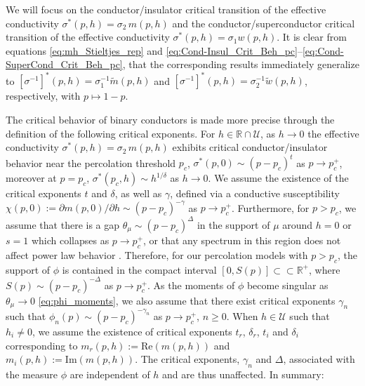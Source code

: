 \documentclass[jmp,graphicx]{revtex4-1}
\begin{document}
We will focus on the conductor/insulator critical transition of the
effective conductivity $\sigma^*(p,h)=\sigma_2\,m(p,h)$ and the
conductor/superconductor critical transition of the effective
conductivity $\sigma^*(p,h)=\sigma_1w(p,h)$. It is clear from equations
\eqref{eq:mh_Stieltjes_rep} and 
\eqref{eq:Cond-Insul_Crit_Beh_pc}--\eqref{eq:Cond-SuperCond_Crit_Beh_pc},
that the corresponding results immediately generalize to
$[\sigma^{-1}]^*(p,h)=\sigma_1^{-1}\tilde{m}(p,h)$ and
$[\sigma^{-1}]^*(p,h)=\sigma_2^{-1}\tilde{w}(p,h)$, respectively, with $p\mapsto1-p$. 

The critical behavior of binary conductors is made more precise
through the definition of the following critical exponents. For
$h\in\mathbb{R}\cap\mathcal{U}$, as $h\to0$ the effective conductivity
$\sigma^*(p,h)=\sigma_2\,m(p,h)$ exhibits critical conductor/insulator behavior
near the percolation threshold $p_c$, $\sigma^*(p,0)\sim(p-p_c)^t$ as
$p\to p_c^+$, moreover at $p=p_c$,
$\sigma^*(p_c,h)\sim h^{1/\delta}$ as $h\to0$. We assume the existence of the
critical exponents $t$ and $\delta$, as well as $\gamma$, defined via a
conductive susceptibility $\chi(p,0):=\partial m(p,0)/\partial h\sim(p-p_c)^{-\gamma}$ as
$p\to p_c^+$. Furthermore, for $p>p_c$, we assume that there is a gap 
$\theta_\mu\sim(p-p_c)^\Delta$ in the support of $\mu$ around $h=0$ or $s=1$ which
collapses as $p\to p_c^+$, or that any spectrum in this region does not
affect power law behavior \cite{Golden:PRL-3935}. Therefore, for our
percolation models with $p>p_c$, the support of $\phi$ is contained in
the compact interval $[0,S(p)]\subset\subset\mathbb{R}^+$, where $S(p)\sim(p-p_c)^{-\Delta}$ as
$p\to p_c^+$. As the moments of $\phi$ become singular as $\theta_\mu\to0$ 
\eqref{eq:phi_moments}, we also assume that there exist critical
exponents $\gamma_n$ such that $\phi_n(p)\sim(p-p_c)^{-\gamma_n}$ as $p\to p_c^+$,
$n\geq0$. When $h\in\mathcal{U}$ such that $h_i\neq0$, we
assume the existence of critical exponents $t_r$, $\delta_r$, $t_i$ and
$\delta_i$ corresponding to $m_r(p,h):=\text{Re}(m(p,h))$ and
$m_i(p,h):=\text{Im}(m(p,h))$. The critical exponents, $\gamma_n$ and $\Delta$,
associated with the measure $\phi$ are independent of $h$ and are thus
unaffected. In summary:  
\end{document}

